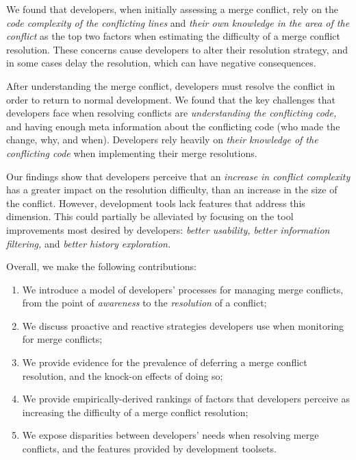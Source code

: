 We found that developers, when initially assessing a merge conflict, rely on the \textit{code complexity of the conflicting lines} and \textit{their own knowledge in the area of the conflict} as the top two factors when estimating the difficulty of a merge conflict resolution.
These concerns cause developers to alter their resolution strategy, and in some cases delay the resolution, which can have negative consequences.

After understanding the merge conflict, developers must resolve the conflict in order to return to normal development.
We found that the key challenges that developers face when resolving conflicts are \textit{understanding the conflicting code,} and having enough meta information about the conflicting code (who made the change, why, and when).
Developers rely heavily on \textit{their knowledge of the conflicting code} when implementing their merge resolutions.

Our findings show that developers perceive that an \textit{increase in conflict complexity} has a greater impact on the resolution difficulty, than an increase in the size of the conflict.
However, development tools lack features that address this dimension.
This could partially be alleviated by focusing on the tool improvements most desired by developers: \textit{better usability, better information filtering,} and \textit{better history exploration.}


Overall, we make the following contributions:
\begin{enumerate}
\item We introduce a model of developers' processes for managing merge conflicts, from the point of \textit{awareness} to the \textit{resolution} of a conflict;
\item We discuss proactive and reactive strategies developers use when monitoring for merge conflicts;
\item We provide evidence for the prevalence of deferring a merge conflict resolution, and the knock-on effects of doing so;
\item We provide empirically-derived rankings of factors that developers perceive as increasing the difficulty of a merge conflict resolution;
\item We expose disparities between developers' needs when resolving merge conflicts, and the features provided by development toolsets.
\end{enumerate}

